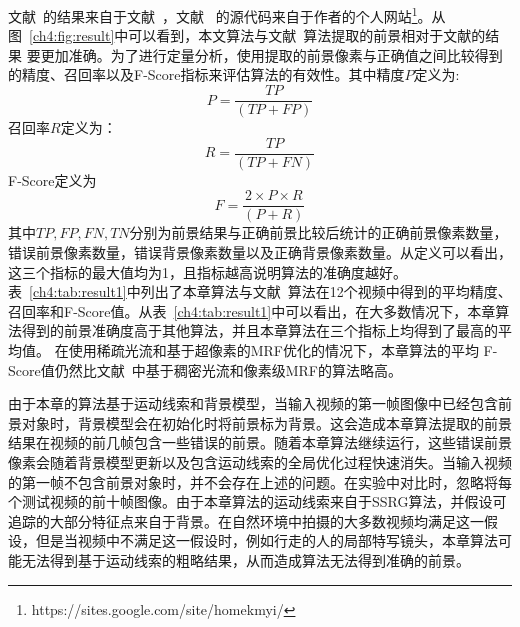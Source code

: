 文献~的结果来自于文献~，文献~ 的源代码来自于作者的个人网站\footnote{https://sites.google.com/site/homekmyi/}。从图~\ref{ch4:fig:result}中可以看到，本文算法与文献~算法提取的前景相对于文献\cite{kwak2011Generalized,5.8s}的结果 要更加准确。为了进行定量分析，使用提取的前景像素与正确值之间比较得到的精度、召回率以及F-Score指标来评估算法的有效性。其中精度$P$定义为:
$$ P = \frac{TP}{(TP+FP)}$$
召回率$R$定义为：
$$R = \frac{TP}{(TP+FN)}$$
F-Score定义为
$$F = \frac{2 \times P \times R}{(P + R)}$$
其中$TP,FP,FN,TN$分别为前景结果与正确前景比较后统计的正确前景像素数量，错误前景像素数量，错误背景像素数量以及正确背景像素数量。从定义可以看出，这三个指标的最大值均为1，且指标越高说明算法的准确度越好。表~\ref{ch4:tab:result1}中列出了本章算法与文献~算法在12个视频中得到的平均精度、召回率和F-Score值。从表~\ref{ch4:tab:result1}中可以看出，在大多数情况下，本章算法得到的前景准确度高于其他算法，并且本章算法在三个指标上均得到了最高的平均值。 在使用稀疏光流和基于超像素的MRF优化的情况下，本章算法的平均 F-Score值仍然比文献~中基于稠密光流和像素级MRF的算法略高。\par

由于本章的算法基于运动线索和背景模型，当输入视频的第一帧图像中已经包含前景对象时，背景模型会在初始化时将前景标为背景。这会造成本章算法提取的前景结果在视频的前几帧包含一些错误的前景。随着本章算法继续运行，这些错误前景像素会随着背景模型更新以及包含运动线索的全局优化过程快速消失。当输入视频的第一帧不包含前景对象时，并不会存在上述的问题。在实验中对比时，忽略将每个测试视频的前十帧图像。由于本章算法的运动线索来自于SSRG算法，并假设可追踪的大部分特征点来自于背景。在自然环境中拍摄的大多数视频均满足这一假设，但是当视频中不满足这一假设时，例如行走的人的局部特写镜头，本章算法可能无法得到基于运动线索的粗略结果，从而造成算法无法得到准确的前景。\par


